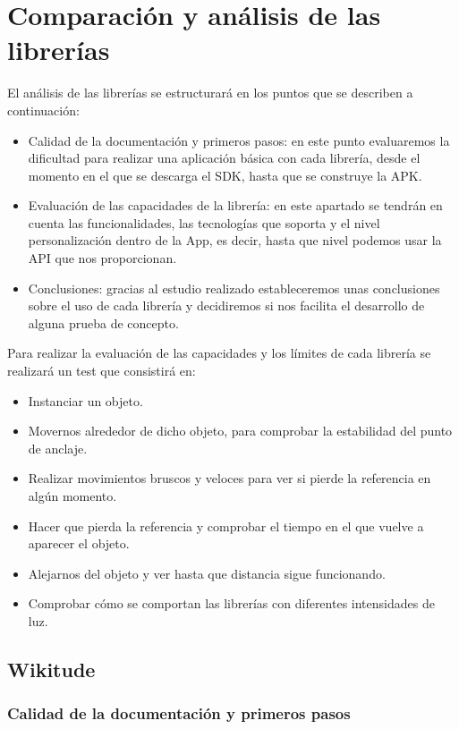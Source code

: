 
\chapter{Comparación y análisis de las librerías}

El análisis de las librerías se estructurará en los puntos que se describen a continuación:
\begin{itemize}
\item Calidad de la documentación y primeros pasos: en este punto evaluaremos la dificultad para realizar una aplicación básica con cada librería, desde el momento en el que se descarga el SDK, hasta que se construye la APK. 
\item Evaluación de las capacidades de la librería: en este apartado se tendrán en cuenta las funcionalidades, las tecnologías que soporta y el nivel personalización dentro de la App, es decir, hasta que nivel podemos usar la API que nos proporcionan.
\item Conclusiones: gracias al estudio realizado estableceremos unas conclusiones sobre el uso de cada librería y decidiremos si nos facilita el desarrollo de alguna prueba de concepto.
\end{itemize}


Para realizar la evaluación de las capacidades y los límites de cada librería se realizará un test que consistirá en:
\begin{itemize}
\item Instanciar un objeto.
\item Movernos alrededor de dicho objeto, para comprobar la estabilidad del punto de anclaje.
\item Realizar movimientos bruscos y veloces para ver si pierde la referencia en algún momento.
\item Hacer que pierda la referencia y comprobar el tiempo en el que vuelve a aparecer el objeto.
\item Alejarnos del objeto y ver hasta que distancia sigue funcionando.
\item Comprobar cómo se comportan las librerías con diferentes intensidades de luz.
\end{itemize}

\section{Wikitude}

\subsection{Calidad de la documentación y primeros pasos}
